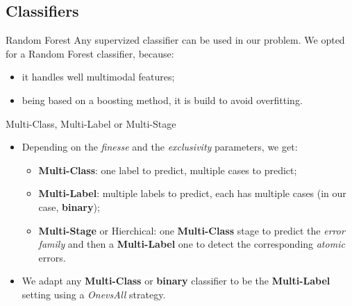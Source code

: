 \documentclass{beamer}
\begin{document}
        \subsection{Classifiers}
            \begin{frame}{Random Forest}
                Any supervized classifier can be used in our problem. We opted for a Random Forest classifier, because:
                \begin{itemize}[label=$\blacktriangleright$, font=\color{IGNGreen}]
                    \item<1-> it handles well multimodal features;
                    \item<2-> being based on a boosting method, it is build to avoid overfitting.
                \end{itemize}
            \end{frame}
            \begin{frame}{Multi-Class, Multi-Label or Multi-Stage}
                \begin{itemize}[label=$\blacktriangleright$, font=\color{IGNGreen}]
                    \item<1-> Depending on the \emph{finesse} and the \emph{exclusivity} parameters, we get:
                    \begin{itemize}[label=--]
                        \item<2-> \textbf{Multi-Class}: one label to predict, multiple cases to predict;
                        \item<3-> \textbf{Multi-Label}: multiple labels to predict, each has multiple cases (in our case, \textbf{binary});
                        \item<3-> \textbf{Multi-Stage} or Hierchical: one \textbf{Multi-Class} stage to predict the \emph{error family} and then a \textbf{Multi-Label} one to detect the corresponding \emph{atomic} errors.
                    \end{itemize}
                    \item<4-> We adapt any \textbf{Multi-Class} or \textbf{binary} classifier to be the \textbf{Multi-Label} setting using a \emph{OnevsAll} strategy.
                \end{itemize}
            \end{frame}
\end{document}
